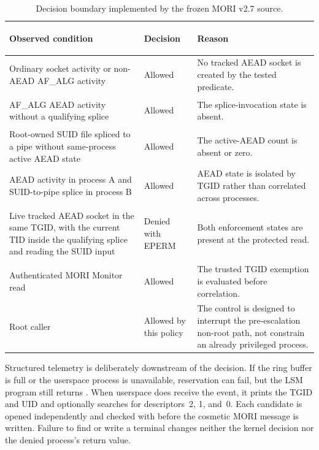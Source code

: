 \begin{table}[H]
    \centering
    \caption{Decision boundary implemented by the frozen MORI v2.7 source.}
    \label{tab:mori-v27-policy-boundary}
    \small
    \begin{tabularx}{\textwidth}{@{}>{\raggedright\arraybackslash}p{}>{\bfseries\raggedright\arraybackslash}p{}Y@{}}
        \toprule
        Observed condition & Decision & Reason \\
        \midrule
        Ordinary socket activity or non-AEAD AF\_ALG activity & Allowed &
        No tracked AEAD socket is created by the tested predicate. \\

        AF\_ALG AEAD activity without a qualifying splice & Allowed &
        The splice-invocation state is absent. \\

        Root-owned SUID file spliced to a pipe without same-process active AEAD
        state & Allowed &
        The active-AEAD count is absent or zero. \\

        AEAD activity in process A and SUID-to-pipe splice in process B &
        Allowed &
        AEAD state is isolated by TGID rather than correlated across processes. \\

        Live tracked AEAD socket in the same TGID, with the current TID inside
        the qualifying splice and reading the SUID input & Denied with EPERM &
        Both enforcement states are present at the protected read. \\

        Authenticated MORI Monitor read & Allowed &
        The trusted TGID exemption is evaluated before correlation. \\

        Root caller & Allowed by this policy &
        The control is designed to interrupt the pre-escalation non-root path,
        not constrain an already privileged process. \\
        \bottomrule
    \end{tabularx}
\end{table}

Structured telemetry is deliberately downstream of the decision. If the ring
buffer is full or the userspace process is unavailable, reservation can fail,
but the LSM program still returns . When userspace does receive the
event, it prints the TGID and UID and optionally searches
 for descriptors~2, 1, and~0. Each candidate is opened
independently and checked with  before the cosmetic MORI message
is written. Failure to find or write a terminal changes neither the kernel
decision nor the denied process's return value.


